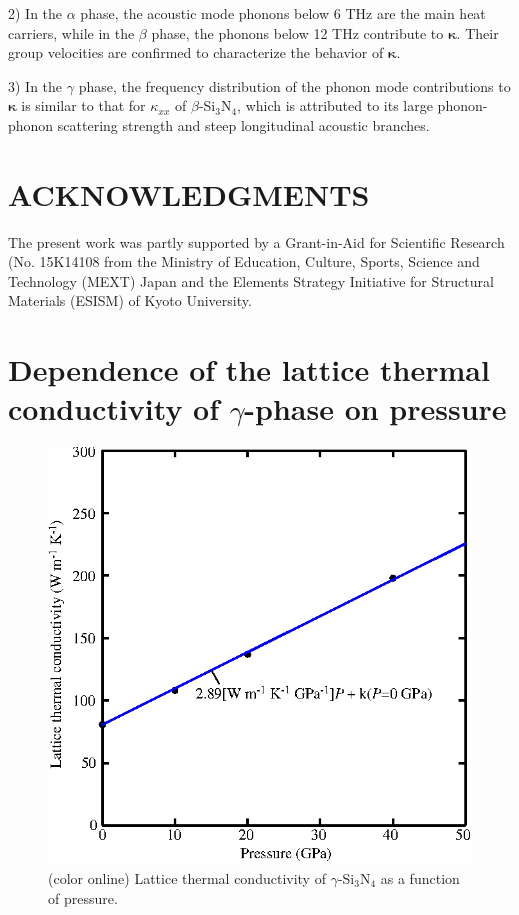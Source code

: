 \documentclass[twocolumn,amsmath,amssymb,a4paper,prb,superscriptaddress,floatfix]{revtex4-1}
\begin{document}
2) In the $\alpha$ phase, the acoustic mode phonons below 6 THz are the main
heat carriers, while in the $\beta$ phase, the phonons below 12 THz contribute
to $\boldsymbol{\kappa}$. Their group velocities are confirmed to characterize
the behavior of $\boldsymbol{\kappa}$.

3) In the $\gamma$ phase, the frequency distribution of the phonon mode
contributions to $\boldsymbol{\kappa}$ is similar to that for $\kappa_{xx}$ of
$\beta$-Si$_3$N$_4$, which is attributed to its large phonon-phonon scattering
strength and steep longitudinal acoustic branches.



\section*{ACKNOWLEDGMENTS}
The present work was partly supported by a Grant-in-Aid for Scientific
Research (No. 15K14108 from the Ministry of Education, Culture, Sports, Science
and Technology (MEXT) Japan and the Elements Strategy Initiative for Structural
Materials (ESISM) of Kyoto University.

\appendix
\section{Dependence of the lattice thermal conductivity of $\gamma$-phase on
pressure}
\begin{figure}[ht]
 \begin{center}
  \includegraphics[width=0.80\linewidth]{S1.eps} \caption{(color online)
  Lattice thermal conductivity of $\gamma$-Si$_3$N$_4$ as a function of pressure.  \label{fig:S1} }
 \end{center}
\end{figure}

\end{document}
